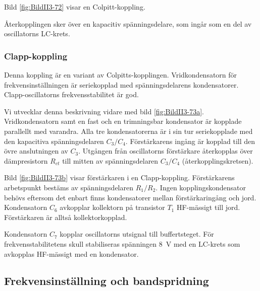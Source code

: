 Bild \ref{fig:BildII3-72} visar en Colpitt-koppling.

Återkopplingen sker över en kapacitiv spänningsdelare, som ingår som
en del av oscillatorns LC-krets.

\subsubsection{Clapp-koppling}

Denna koppling är en variant av Colpitts-kopplingen.
Vridkondensatorn för frekvensinställningen är seriekopplad med spänningsdelarens
kondensatorer.
Clapp-oscillatorns frekvensstabilitet är god.

Vi utvecklar denna beskrivning vidare med bild \ref{fig:BildII3-73a}.
Vridkondensatorn samt en fast och en trimningsbar kondensator är kopplade
parallellt med varandra.
Alla tre kondensatorerna är i sin tur seriekopplade med den kapacitiva
spänningsdelaren \(C_3/C_4\).
Förstärkarens ingång är kopplad till den övre anslutningen av \(C_3\).
Utgången från oscillatorns förstärkare återkopplas över dämpresistorn
\(R_{ct}\) till mitten av spänningsdelaren \(C_3/C_4\)
(återkopplingskretsen).

Bild \ref{fig:BildII3-73b} visar förstärkaren i en Clapp-koppling.
Förstärkarens arbetspunkt bestäms av spänningsdelaren \(R_1/R_2\).
Ingen kopplingskondensator behövs eftersom det enbart finns kondensatorer
mellan förstärkaringång och jord.
Kondensatorn \(C_6\) avkopplar kollektorn på transistor \(T_1\) HF-mässigt till
jord.
Förstärkaren är alltså kollektorkopplad.

Kondensatorn \(C_7\) kopplar oscillatorns utsignal till buffertsteget.
För frekvensstabilitetens skull stabiliseras spänningen 8~V med en
LC-krets som avkopplas HF-mässigt med en kondensator.

\subsection{Frekvensinställning och bandspridning}

